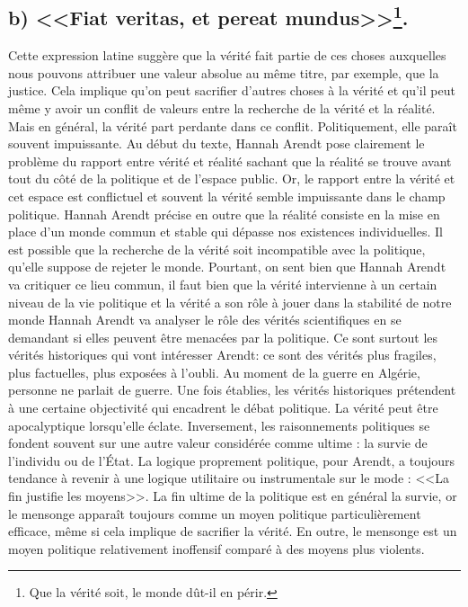 \documentclass[12pt]{article}
\begin{document}
\subsection*{b) <<Fiat veritas, et pereat mundus>>\footnote{Que la vérité soit, le monde dût-il en périr.}.}
Cette expression latine suggère que la vérité fait partie de ces choses auxquelles nous pouvons attribuer une valeur absolue au même titre, par exemple, que la justice.
Cela implique qu'on peut sacrifier d'autres choses à la vérité et qu'il peut même y avoir un conflit de valeurs entre la recherche de la vérité et la réalité.
Mais en général, la vérité part perdante dans ce conflit.
Politiquement, elle paraît souvent impuissante.
Au début du texte, Hannah Arendt pose clairement le problème du rapport entre vérité et réalité sachant que la réalité se trouve avant tout du côté de la politique et de l'espace public.
Or, le rapport entre la vérité et cet espace est conflictuel et souvent la vérité semble impuissante dans le champ politique.
Hannah Arendt précise en outre que la réalité consiste en la mise en place d'un monde commun et stable qui dépasse nos existences individuelles.
Il est possible que la recherche de la vérité soit incompatible avec la politique, qu'elle suppose de rejeter le monde.
Pourtant, on sent bien que Hannah Arendt va critiquer ce lieu commun, il faut bien que la vérité intervienne à un certain niveau de la vie politique et la vérité a son rôle à jouer dans la stabilité de notre monde
Hannah Arendt va analyser le rôle des vérités scientifiques en se demandant si elles peuvent être menacées par la politique.
Ce sont surtout les vérités historiques qui vont intéresser Arendt: ce sont des vérités plus fragiles, plus factuelles, plus exposées à l'oubli.
Au moment de la guerre en Algérie, personne ne parlait de guerre.
Une fois établies, les vérités historiques prétendent à une certaine objectivité qui encadrent le débat politique.
La vérité peut être apocalyptique lorsqu'elle éclate.
Inversement, les raisonnements politiques se fondent souvent sur une autre valeur considérée comme ultime : la survie de l'individu ou de l'État.
La logique proprement politique, pour Arendt, a toujours tendance à revenir à une logique utilitaire ou instrumentale sur le mode : <<La fin justifie les moyens>>.
La fin ultime de la politique est en général la survie, or le mensonge apparaît toujours comme un moyen politique particulièrement efficace, même si cela implique de sacrifier la vérité.
En outre, le mensonge est un moyen politique relativement inoffensif comparé à des moyens plus violents.
\end{document}
